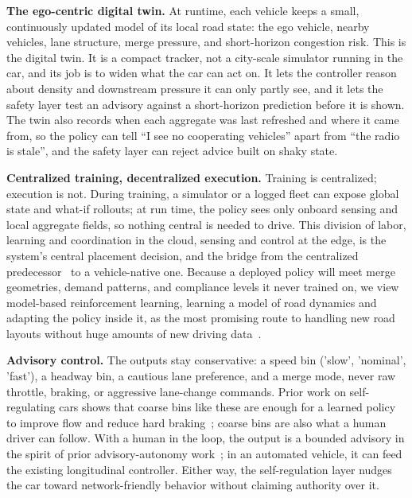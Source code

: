 \noindent\textbf{The ego-centric digital twin.}
At runtime, each vehicle keeps a small, continuously updated model of its local road state: the ego vehicle, nearby vehicles, lane structure, merge pressure, and short-horizon congestion risk. This is the digital twin. It is a compact tracker, not a city-scale simulator running in the car, and its job is to widen what the car can act on. It lets the controller reason about density and downstream pressure it can only partly see, and it lets the safety layer test an advisory against a short-horizon prediction before it is shown. The twin also records when each aggregate was last refreshed and where it came from, so the policy can tell ``I see no cooperating vehicles'' apart from ``the radio is stale'', and the safety layer can reject advice built on shaky state.

\noindent\textbf{Centralized training, decentralized execution.}
Training is centralized; execution is not. During training, a simulator or a logged fleet can expose global state and what-if rollouts; at run time, the policy sees only onboard sensing and local aggregate fields, so nothing central is needed to drive. This division of labor, learning and coordination in the cloud, sensing and control at the edge, is the system's central placement decision, and the bridge from the centralized predecessor~\cite{self_regulating_cars} to a vehicle-native one. Because a deployed policy will meet merge geometries, demand patterns, and compliance levels it never trained on, we view model-based reinforcement learning, learning a model of road dynamics and adapting the policy inside it, as the most promising route to handling new road layouts without huge amounts of new driving data~\cite{sutton1991dyna,janner2019trust,hafner2020dream}.

\noindent\textbf{Advisory control.}
The outputs stay conservative: a speed bin ('slow', 'nominal', 'fast'), a headway bin, a cautious lane preference, and a merge mode, never raw throttle, braking, or aggressive lane-change commands. Prior work on self-regulating cars shows that coarse bins like these are enough for a learned policy to improve flow and reduce hard braking~\cite{self_regulating_cars}; coarse bins are also what a human driver can follow. With a human in the loop, the output is a bounded advisory in the spirit of prior advisory-autonomy work~\cite{Yan_2023,cho2023temporal,fridman2018human}; in an automated vehicle, it can feed the existing longitudinal controller. Either way, the self-regulation layer nudges the car toward network-friendly behavior without claiming authority over it.

